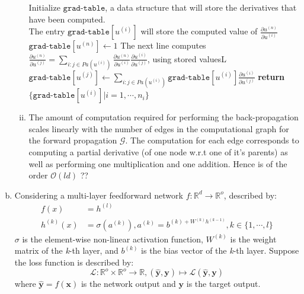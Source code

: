 \documentclass[fleqn]{article}
\begin{document}
\begin{enumerate}[a)]
\begin{enumerate}[i)]
\begin{algorithm}
\begin{algorithmic}[1]
                \State Initialize $\texttt{grad-table}$, a data structure that will store the derivatives
                that have been computed.\\
                The entry $\texttt{grad-table} [u^{(i)}]$ will store the
                computed value of $\frac{\partial u^{(n)}}{\partial u^{(i)}}$
                \State $\texttt{grad-table}[u^{(n)}] \gets 1 $
                \State The next line computes 
                $\frac{\partial u^{(n)}}{\partial u^{(j)}} = \sum_{i:j \in Pa(u^{(i)})} \frac{\partial u^{(n)}}{\partial u^{(i)}}
                \frac{\partial u^{(i)}}{\partial u^{(j)}}$,
                using stored valuesL
                \State $\texttt{grad-table}[u^{(j)}] \gets \sum_{i:j \in Pa(u^{(i)})} \texttt{grad-table}[u^{(i)}]
                \frac{\partial u^{(i)}}{\partial u^{(j)}}$
                \State \textbf{return} $\{\texttt{grad-table}[u^{(i)}] | i = 1, \cdots, n_i\}$
            \end{algorithmic}
        \end{algorithm}
        
        \item
        The amount of computation required for performing the back-propagation scales linearly with the number of edges in the computational graph for the forward propagation $\mathcal{G}$. The computation for each edge corresponds to computing a partial derivative (of one node w.r.t one of it's parents) as well as performing one multiplication and one addition. Hence is of the order $\mathcal{O}(ld)$ ??
    \end{enumerate}

\item
Considering a multi-layer feedforward network $f: \mathbb{R}^d \rightarrow \mathbb{R}^o$, described by:
	\begin{equation*}
	\begin{aligned}
		f(x) &= h^{(l)} \\
		h^{(k)}(x) &= \sigma(a^{(k)}), a^{(k)} = b^{(k) + W^{(k)} h^{(k-1)}}, k \in \{1, \cdots, l\}
	\end{aligned}
	\end{equation*}
	$\sigma$ is the element-wise non-linear activation function, $W^{(k)}$ is the weight matrix of the \textit{k}-th 
	layer, and $b^(k)$ is the bias vector of the \textit{k}-th layer.
	Suppose the loss function is described by:
	\begin{equation*}
		\mathcal{L}: \mathbb{R}^o \times \mathbb{R}^o \rightarrow \mathbb{R}, (\bm{\hat{y}}, \bm{y}) \mapsto 
		\mathcal{L}(\bm{\hat{y}}, \bm{y})
	\end{equation*}
	where $\bm{\hat{y}} = f(\bm{x})$ is the network output and $\bm{y}$ is the target output.
	

\end{enumerate}
\end{document}
